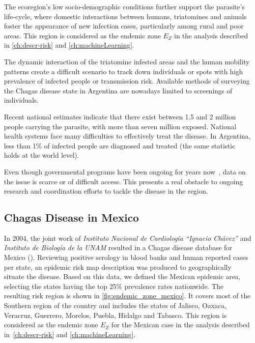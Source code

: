 The ecoregion's low socio-demographic conditions further support the parasite's life-cycle, where domestic interactions between humans, triatomines and animals foster the appearance of new infection cases, particularly among rural and poor areas.
This region is considered as the endemic zone $E_Z$ in the analysis described in \cref{ch:descr-risk} and \cref{ch:machineLearning}.


The dynamic interaction of the triatomine infested areas and the human mobility patterns create a difficult scenario to track down individuals or spots with high prevalence of infected people or transmission risk.
Available methods of surveying the Chagas disease state in Argentina are nowadays limited to screenings of individuals.

Recent national estimates indicate that there exist between 1.5 and 2 million people carrying the parasite, with more than seven million exposed. National health systems face many difficulties to effectively treat the disease.
In Argentina, less than 1\% of infected people are diagnosed and treated
(the same statistic holds at the world level).

Even though governmental programs have been ongoing for years now~\citep{plan_nacional_chagas}, data on the issue is scarce or of difficult access.
This presents a real obstacle to ongoing research and coordination efforts to tackle the disease in the region.


\subsection{Chagas Disease in  Mexico}\label{endemic_zone_mexico}


In 2004, the joint work of \textit{Instituto Nacional de Cardiología ``Ignacio Chávez''} and  \textit{Instituto de Biología de la UNAM} resulted in a Chagas disease database for Mexico (\citep{cruz2006chagmex}).
Reviewing positive serology in blood banks and human reported cases per state, an epidemic risk map description was produced to geographically situate the disease.
Based on this data, we defined the Mexican epidemic area, selecting the states having the top 25\% prevalence rates nationwide.
The resulting risk region is shown in \cref{fig:endemic_zone_mexico}.
It covers most of the Southern region of the country and includes the states of Jalisco, Oaxaca, Veracruz, Guerrero, Morelos, Puebla, Hidalgo and Tabasco.
This region is considered as the endemic zone $E_Z$ for the Mexican case in the analysis described in~\cref{ch:descr-risk} and \cref{ch:machineLearning}.

